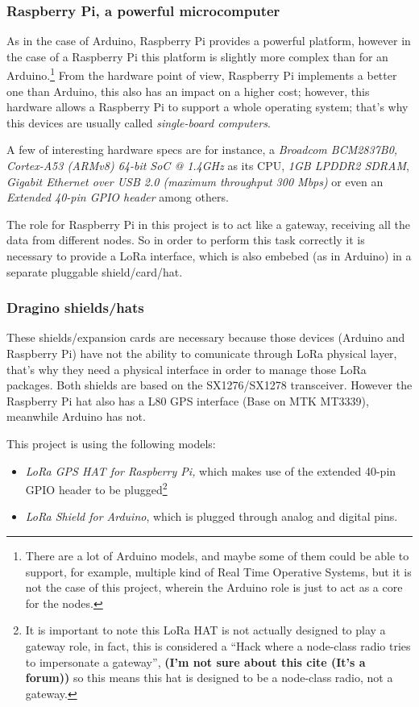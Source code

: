 \documentclass[11pt,a4paper,dvipsnames,twoside]{article}
\newcommand{\doubt}[1] {\textbf{\color{Red3}#1}}
\begin{document}
\subsubsection{Raspberry Pi, a powerful microcomputer}
As in the case of Arduino, Raspberry Pi provides a powerful platform, however in the case of a Raspberry Pi this platform is slightly more complex than for an Arduino.\footnote{There are a lot of Arduino models, and maybe some of them could be able to support, for example, multiple kind of Real Time Operative Systems, but it is not the case of this project, wherein the Arduino role is just to act as a core for the nodes.} From the hardware point of view, Raspberry Pi implements a better one than Arduino, this also has an impact on a higher cost; however, this hardware allows a Raspberry Pi to support a whole operating system; that's why this devices are usually called \textit{single-board computers}.

A few of interesting hardware specs are for instance, a \textit{Broadcom BCM2837B0, Cortex-A53 (ARMv8) 64-bit SoC @ 1.4GHz} as its CPU, \textit{1GB LPDDR2 SDRAM}, \textit{Gigabit Ethernet over USB 2.0 (maximum throughput 300 Mbps)} or even an \textit{Extended 40-pin GPIO header} among others.\cite{RPiSpecs}

The role for Raspberry Pi in this project is to act like a gateway, receiving all the data from different nodes. So in order to perform this task correctly it is necessary to provide a LoRa interface, which is also embebed (as in Arduino) in a separate pluggable shield/card/hat.

\subsubsection{Dragino shields/hats}\label{sssec:DraginoShields}
These shields/expansion cards are necessary because those devices (Arduino and Raspberry Pi) have not the ability to comunicate through LoRa physical layer, that's why they need a physical interface in order to manage those LoRa packages. Both shields are based on the SX1276/SX1278 transceiver. However the Raspberry Pi hat also has a L80 GPS interface (Base on MTK MT3339), meanwhile Arduino has not.

This project is using the following models: 

\begin{itemize}
  \item \textit{LoRa GPS HAT for Raspberry Pi,}\cite{DraginoRpiHat} which makes use of the extended 40-pin GPIO header to be plugged\footnote{It is important to note this LoRa HAT is not actually designed to play a gateway role, in fact, this is considered a \enquote{Hack where a node-class radio tries to impersonate a gateway}\cite{RpiHatHack}, \doubt{(I'm not sure about this cite (It's a forum))} so this means this hat is designed to be a node-class radio, not a gateway.}
  \item \textit{LoRa Shield for Arduino}\cite{DraginoArdShield}, which is plugged through analog and digital pins.
\end{itemize}
\end{document}
